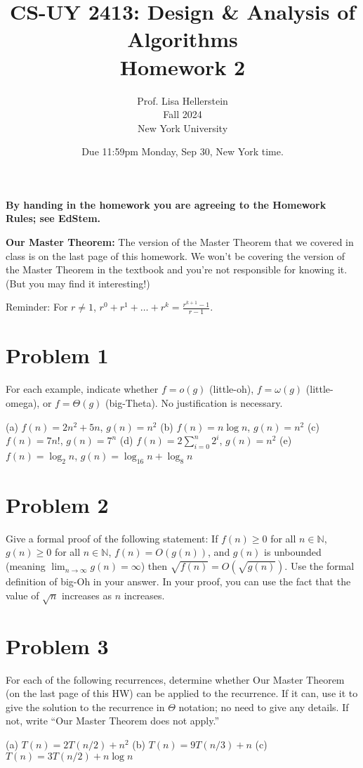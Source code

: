 \documentclass{article}
\title{CS-UY 2413: Design \& Analysis of Algorithms\\ Homework 2}
\author{Prof. Lisa Hellerstein\\ Fall 2024\\ New York University}
\date{Due 11:59pm Monday, Sep 30, New York time.}
\begin{document}
\maketitle

\textbf{By handing in the homework you are agreeing to the Homework Rules; see EdStem.}

\textbf{Our Master Theorem:} The version of the Master Theorem that we covered in class is on the last page of this homework. We won’t be covering the version of the Master Theorem in the textbook and you’re not responsible for knowing it. (But you may find it interesting!)

Reminder: For $r \neq 1$, $r^0 + r^1 + \dots + r^k = \frac{r^{k+1} - 1}{r - 1}$.

\section*{Problem 1}
For each example, indicate whether $f = o(g)$ (little-oh), $f = \omega(g)$ (little-omega), or $f = \Theta(g)$ (big-Theta). No justification is necessary.

(a) $f(n) = 2n^2 + 5n$, $g(n) = n^2$
(b) $f(n) = n \log n$, $g(n) = n^2$
(c) $f(n) = 7n!$, $g(n) = 7^n$
(d) $f(n) = 2 \sum_{i=0}^n 2^i$, $g(n) = n^2$
(e) $f(n) = \log_2 n$, $g(n) = \log_{16} n + \log_8 n$

\section*{Problem 2}
Give a formal proof of the following statement: If $f(n) \ge 0$ for all $n \in \mathbb{N}$, $g(n) \ge 0$ for all $n \in \mathbb{N}$, $f(n) = O(g(n))$, and $g(n)$ is unbounded (meaning $\lim_{n \to \infty} g(n) = \infty$) then $\sqrt{f(n)} = O(\sqrt{g(n)})$.
Use the formal definition of big-Oh in your answer. In your proof, you can use the fact that the value of $\sqrt{n}$ increases as $n$ increases.


\section*{Problem 3}
For each of the following recurrences, determine whether Our Master Theorem (on the last page of this HW) can be applied to the recurrence. If it can, use it to give the solution to the recurrence in $\Theta$ notation; no need to give any details. If not, write “Our Master Theorem does not apply.”

(a) $T(n) = 2T(n/2) + n^2$
(b) $T(n) = 9T(n/3) + n$
(c) $T(n) = 3T(n/2) + n \log n$
\end{document}
